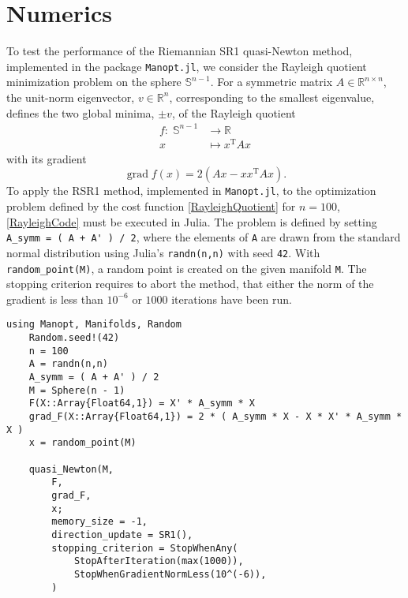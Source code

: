 \chapter{Numerics}

To test the performance of the Riemannian SR1 quasi-Newton method, implemented in the package \lstinline!Manopt.jl!, we consider the Rayleigh quotient minimization problem on the sphere $\mathbb{S}^{n-1}$. For a symmetric matrix $A \in \mathbb{R}^{n \times n}$, the unit-norm eigenvector, $v \in \mathbb{R}^n$, corresponding to the smallest eigenvalue, defines the two global minima, $\pm v$, of the Rayleigh quotient  
\begin{equation}\label{RayleighQuotient}
    \begin{split}
        f \colon \; \mathbb{S}^{n-1} & \to \mathbb{R} \\
        x & \mapsto x^{\mathrm{T}} A x 
    \end{split}
\end{equation}   
with its gradient 
\begin{equation*}
    \operatorname{grad} f(x) = 2(Ax - x x^{\mathrm{T}} A x).
\end{equation*}
To apply the RSR1 method, implemented in \lstinline!Manopt.jl!, to the optimization problem defined by the cost function \cref{RayleighQuotient} for $n=100$, \cref{RayleighCode} must be executed in Julia. The problem is defined by setting \lstinline!A_symm = ( A + A' ) / 2!, where the elements of \lstinline!A! are drawn from the standard normal distribution using Julia’s \lstinline!randn(n,n)! with seed \lstinline!42!. With \lstinline!random_point(M)!, a random point is created on the given manifold \lstinline!M!. The stopping criterion requires to abort the method, that either the norm of the gradient is less than $10^{-6}$ or $1000$ iterations have been run. \\
\begin{lstlisting}[caption={The Rayleigh quotient minimization experiment in Julia for $n = 100$.}, label={RayleighCode}]
    using Manopt, Manifolds, Random
    Random.seed!(42)
    n = 100
    A = randn(n,n)
    A_symm = ( A + A' ) / 2
    M = Sphere(n - 1)
    F(X::Array{Float64,1}) = X' * A_symm * X
    grad_F(X::Array{Float64,1}) = 2 * ( A_symm * X - X * X' * A_symm * X )
    x = random_point(M)
    
    quasi_Newton(M, 
        F, 
        grad_F, 
        x; 
        memory_size = -1, 
        direction_update = SR1(),
        stopping_criterion = StopWhenAny(
            StopAfterIteration(max(1000)),
            StopWhenGradientNormLess(10^(-6)),
        )
\end{lstlisting}
